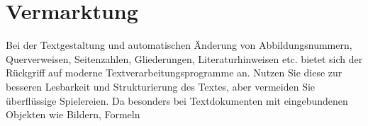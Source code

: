 \section{Vermarktung}
Bei der Textgestaltung und automatischen Änderung von Abbildungsnummern, Querverweisen,
Seitenzahlen, Gliederungen, Literaturhinweisen etc. bietet sich der Rückgriff
auf moderne Textverarbeitungsprogramme an. Nutzen Sie diese zur besseren Lesbarkeit
und Strukturierung des Textes, aber vermeiden Sie überflüssige Spielereien. Da
besonders bei Textdokumenten mit eingebundenen Objekten wie Bildern, Formeln
